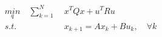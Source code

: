 \documentclass[preview]{standalone}
\begin{document}
\begin{align*}
\underset{q}{min}  \quad \sum_{k=1}^N \; &x^TQx + u^T R u \\ s.t. \quad &x_{k+1} = Ax_k + Bu_k, \quad \forall k
\end{align*}
\end{document}

